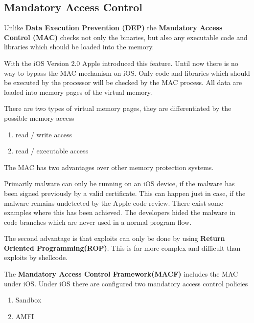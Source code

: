 \subsection{Mandatory Access Control}
Unlike \textbf{Data Execution Prevention (DEP)} the \textbf{Mandatory Access Control (MAC)} checks not only the binaries, but also any executable code and libraries which should be loaded into the memory. \par
With the iOS Version 2.0 Apple introduced this feature. Until now there is no way to bypass the MAC mechanism on iOS. Only code and libraries which should be executed by the processor will be checked by the MAC process. All data are loaded into memory pages of the virtual memory. \cite{iOSSec[5], Hacking[1]}

There are two types of virtual memory pages, they are differentiated by the possible memory access
\begin{enumerate}
    \item read / write access
    \item read / executable access
\end{enumerate}

The MAC has two advantages over other memory protection systems. \par 
Primarily malware can only be running on an iOS device, if the malware has been signed previously by a valid certificate. This can happen just in case, if the malware remains undetected by the Apple code review. There exist some examples where this has been achieved. The developers hided the malware in code branches which are never used in a normal program flow. \cite{iOSSec[5], Hacking[1]} \par
 
The second advantage is that exploits can only be done by using \textbf{Return Oriented Programming(ROP)}. This is far more complex and difficult than exploits by shellcode. \cite{Architecture[1], Architecture[2], Architecture[3], ROP[1], ROP[2], iOSSec[5], Hacking[1]}

The \textbf{Mandatory Access Control Framework(MACF)} includes the MAC under iOS. Under iOS there are configured two mandatory access control policies
\begin{enumerate}
   \item Sandbox
   \item AMFI
\end{enumerate}
\cite{iOSSec[5], Hacking[1]}


